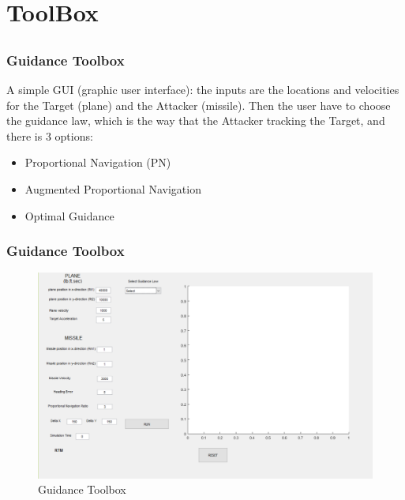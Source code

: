 \documentclass{beamer}
\begin{document}

\section{ToolBox}

\subsection{}
\begin{frame}
\frametitle{Guidance Toolbox}
A simple GUI (graphic user interface): the inputs are the locations and velocities for the Target (plane) and the Attacker (missile). Then the user have to choose the guidance law, which is the way that the Attacker tracking the Target, and there is 3 options:
\begin{itemize}
	\item Proportional Navigation (PN)
	\item Augmented Proportional Navigation
	\item Optimal Guidance
\end{itemize} 
\end{frame}
\begin{frame}
\frametitle{Guidance Toolbox}
\begin{figure}[H]
\centering
\includegraphics[scale = 0.35]{fig/GUI.PNG}
\caption{Guidance Toolbox}
\label{Guidance Toolbox}
\end{figure}
\end{frame}
\end{document}
